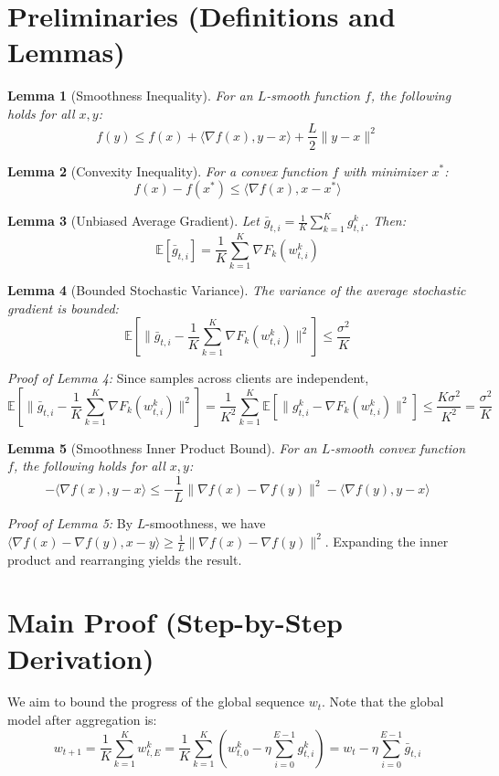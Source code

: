 \documentclass{article}
\newtheorem{lemma}{Lemma}
\begin{document}
\newpage
\section*{Preliminaries (Definitions and Lemmas)}
\begin{lemma}[Smoothness Inequality]
For an $L$-smooth function $f$, the following holds for all $x, y$:
$$ f(y) \leq f(x) + \langle \nabla f(x), y - x \rangle + \frac{L}{2}\|y - x\|^2 $$
\end{lemma}

\begin{lemma}[Convexity Inequality]
For a convex function $f$ with minimizer $x^*$:
$$ f(x) - f(x^*) \leq \langle \nabla f(x), x - x^* \rangle $$
\end{lemma}

\begin{lemma}[Unbiased Average Gradient]
Let $\bar{g}_{t,i} = \frac{1}{K}\sum_{k=1}^K g_{t,i}^k$. Then:
$$ \mathbb{E}[\bar{g}_{t,i}] = \frac{1}{K}\sum_{k=1}^K \nabla F_k(w_{t,i}^k) $$
\end{lemma}

\begin{lemma}[Bounded Stochastic Variance]
The variance of the average stochastic gradient is bounded:
$$ \mathbb{E}[\|\bar{g}_{t,i} - \frac{1}{K}\sum_{k=1}^K \nabla F_k(w_{t,i}^k)\|^2] \leq \frac{\sigma^2}{K} $$
\end{lemma}
\textit{Proof of Lemma 4:} Since samples across clients are independent,
$$ \mathbb{E}[\|\bar{g}_{t,i} - \frac{1}{K}\sum_{k=1}^K \nabla F_k(w_{t,i}^k)\|^2] = \frac{1}{K^2}\sum_{k=1}^K \mathbb{E}[\|g_{t,i}^k - \nabla F_k(w_{t,i}^k)\|^2] \leq \frac{K\sigma^2}{K^2} = \frac{\sigma^2}{K} $$

\begin{lemma}[Smoothness Inner Product Bound]
For an $L$-smooth convex function $f$, the following holds for all $x, y$:
$$ - \langle \nabla f(x), y - x \rangle \leq - \frac{1}{L} \|\nabla f(x) - \nabla f(y)\|^2 - \langle \nabla f(y), y - x \rangle $$
\end{lemma}
\textit{Proof of Lemma 5:} By $L$-smoothness, we have $\langle \nabla f(x) - \nabla f(y), x - y \rangle \geq \frac{1}{L} \|\nabla f(x) - \nabla f(y)\|^2$. Expanding the inner product and rearranging yields the result.

\section*{Main Proof (Step-by-Step Derivation)}
We aim to bound the progress of the global sequence $w_t$. Note that the global model after aggregation is:
$$ w_{t+1} = \frac{1}{K}\sum_{k=1}^K w_{t,E}^k = \frac{1}{K}\sum_{k=1}^K \left( w_{t,0}^k - \eta \sum_{i=0}^{E-1} g_{t,i}^k \right) = w_t - \eta \sum_{i=0}^{E-1} \bar{g}_{t,i} $$
\end{document}
